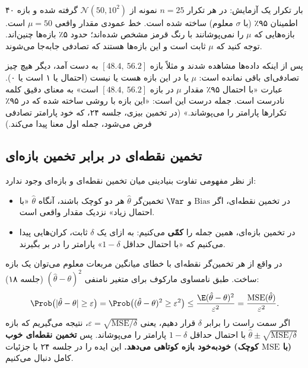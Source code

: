 \begin{center}
\begin{tikzpicture}
\end{tikzpicture}\\
{\small ۴۰ بار تکرار یک آزمایش: در هر تکرار $n=25$ نمونه از $\mathcal N(50,10^2)$ گرفته شده و بازه اطمینان ۹۵٪ (با $\sigma$ معلوم) ساخته شده است. خط عمودی مقدار واقعی $\mu=50$ است. بازه‌هایی که $\mu$ را نمی‌پوشانند با رنگ قرمز مشخص شده‌اند؛ حدود ۵٪ بازه‌ها چنین‌اند. توجه کنید که $\mu$ ثابت است و این بازه‌ها هستند که تصادفی جابه‌جا می‌شوند.}
\end{center}

\begin{warning}
\warntitle پس از اینکه داده‌ها مشاهده شدند و مثلاً بازه $[48.4,\ 56.2]$ به دست آمد، دیگر هیچ چیز تصادفی‌ای باقی نمانده است: $\mu$ یا در این بازه هست یا نیست (احتمال یا ۱ است یا ۰). عبارت «با احتمال ۹۵٪ مقدار $\mu$ در بازه $[48.4,\ 56.2]$ است» به معنای دقیق کلمه نادرست است. جمله درست این است: «این بازه با روشی ساخته شده که در ۹۵٪ تکرارها پارامتر را می‌پوشاند.» (در تخمین بیزی، جلسه ۲۴، که خود پارامتر تصادفی فرض می‌شود، جمله اول معنا پیدا می‌کند.)
\end{warning}

\subsection{تخمین نقطه‌ای در برابر تخمین بازه‌ای}
از نظر مفهومی تفاوت بنیادینی میان تخمین نقطه‌ای و بازه‌ای وجود ندارد:
\begin{itemize}
\item در تخمین نقطه‌ای، اگر $\mathrm{Bias}$ و $\Var$ تخمین‌گر $\hat\theta$ هر دو کوچک باشند، آنگاه $\hat\theta$ «با احتمال زیاد» نزدیک مقدار واقعی است.
\item در تخمین بازه‌ای، همین جمله را \textbf{کمّی} می‌کنیم: به ازای یک $\delta$ ثابت، کران‌هایی پیدا می‌کنیم که «با احتمال حداقل $1-\delta$» پارامتر را در بر بگیرند.
\end{itemize}
در واقع از هر تخمین‌گر نقطه‌ای با خطای میانگین مربعات معلوم می‌توان یک بازه ساخت. طبق نامساوی مارکوف برای متغیر نامنفی $(\hat\theta-\theta)^2$ (جلسه ۱۸):
\[
\Prob\big(|\hat\theta-\theta|\ge\varepsilon\big)=\Prob\big((\hat\theta-\theta)^2\ge\varepsilon^2\big)\le\frac{\E(\hat\theta-\theta)^2}{\varepsilon^2}=\frac{\mathrm{MSE}(\hat\theta)}{\varepsilon^2}.
\]
اگر سمت راست را برابر $\delta$ قرار دهیم، یعنی $\varepsilon=\sqrt{\mathrm{MSE}/\delta}$، نتیجه می‌گیریم که بازه $\hat\theta\pm\sqrt{\mathrm{MSE}/\delta}$ با احتمال حداقل $1-\delta$ پارامتر را می‌پوشاند. پس \textbf{تخمین نقطه‌ای خوب (با $\mathrm{MSE}$ کوچک) خودبه‌خود بازه کوتاهی می‌دهد.} این ایده را در جلسه ۲۴ با جزئیات کامل دنبال می‌کنیم.

